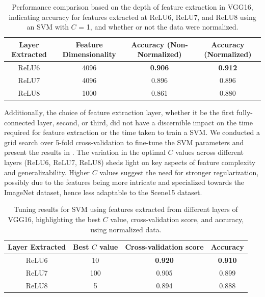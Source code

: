 \begin{table}[H]
    \centering
    \begin{tabular}{@{}cccc@{}}
        \toprule
        \textbf{Layer Extracted} & \textbf{Feature Dimensionality} & \textbf{Accuracy (Non-Normalized)} & \textbf{Accuracy (Normalized)} \\
        \midrule \midrule
        ReLU6                    & 4096                            & \textbf{0.906}                     & \textbf{0.912}                 \\
        ReLU7                    & 4096                            & 0.896                              & 0.896                          \\
        ReLU8                    & 1000                            & 0.861                              & 0.880                          \\
        \bottomrule
    \end{tabular}
    \caption{Performance comparison based on the depth of feature extraction in VGG16, indicating accuracy for features extracted at ReLU6, ReLU7, and ReLU8 using an SVM with $C$ = 1, and whether or not the data were normalized.}
    \label{tab:depth_influence}
\end{table}

Additionally, the choice of feature extraction layer, whether it be the first fully-connected layer, second, or third, did not have a discernible impact on the time required for feature extraction or the time taken to train a SVM. We conducted a grid search over 5-fold cross-validation to fine-tune the SVM parameters and present the results in . The variation in the optimal $C$ values across different layers (ReLU6, ReLU7, ReLU8) sheds light on key aspects of feature complexity and generalizability. Higher $C$ values suggest the need for stronger regularization, possibly due to the features being more intricate and specialized towards the ImageNet dataset, hence less adaptable to the Scene15 dataset.

\begin{table}[H]
    \centering
    \begin{tabular}{@{}cccc@{}}
        \toprule
        \textbf{Layer Extracted} & \textbf{Best $C$ value} & \textbf{Cross-validation score} & \textbf{Accuracy} \\
        \midrule \midrule
        ReLU6                    & 10                     & \textbf{0.920}                  & \textbf{0.910}    \\
        ReLU7                    & 100                     & 0.905                           & 0.899             \\
        ReLU8                    & 5                       & 0.894                           & 0.888             \\
        \bottomrule
    \end{tabular}
    \caption{Tuning results for SVM using features extracted from different layers of VGG16, highlighting the best $C$ value, cross-validation score, and accuracy, using normalized data.}
    \label{tab:svm_tuned}
\end{table}

